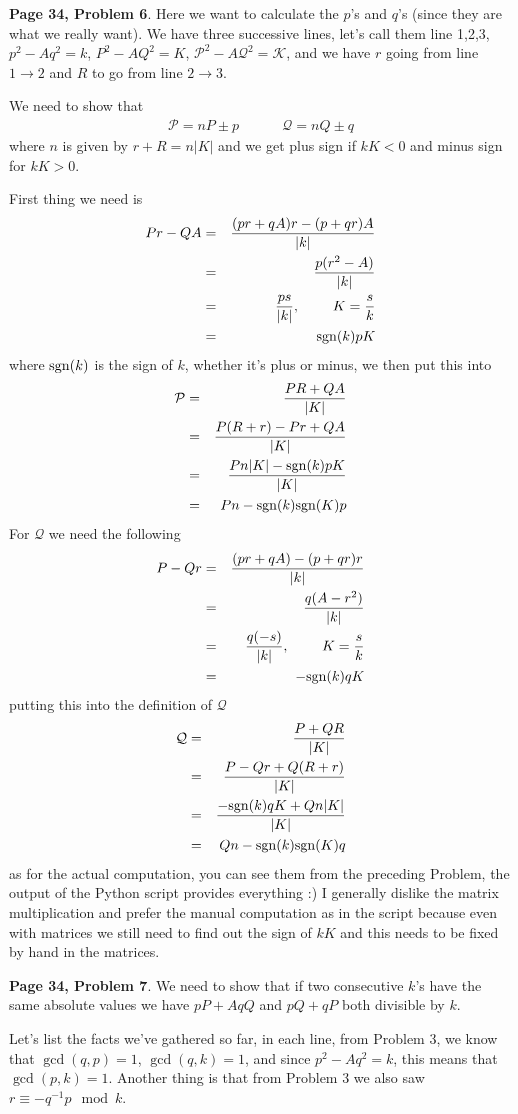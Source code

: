 \documentclass[aps,preprint,preprintnumbers,nofootinbib,showpacs,prd]{revtex4-1}
\newcommand{\nbea}{\begin{eqnarray*}}
\newcommand{\neea}{\end{eqnarray*}}
\begin{document}
{\bf Page 34, Problem 6}. Here we want to calculate the $p$'s and $q$'s (since they are what we really want). We have three successive lines, let's call them line 1,2,3, $p^2 - Aq^2 = k$, $P^2 - AQ^2 = K$, $\mathcal{P}^2 - A\mathcal{Q}^2 = \mathcal{K}$, and we have $r$ going from line $1\to2$ and $R$ to go from line $2\to3$.

We need to show that 
%
\nbea
\mathcal{P} = nP \pm p ~~~~~~~~~~~~~~ \mathcal{Q} = nQ \pm q
\neea
%
where $n$ is given by $r + R = n|K|$ and we get plus sign if $kK < 0$ and minus sign for $kK > 0$.

First thing we need is
%
\nbea
Pr - QA & = & \frac{(pr + qA)r - (p + qr)A}{|k|} \\
& = & \frac{p(r^2 - A)}{|k|} \\
& = & \frac{ps}{|k|}, ~~~~~~~ K = \frac{s}{k} \\
& = & {\rm sgn}(k) pK
\neea
%
where ${\rm sgn}(k)$ is the sign of $k$, whether it's plus or minus, we then put this into
%
\nbea
\mathcal{P} & = & \frac{PR + QA}{|K|} \\
& = & \frac{P(R + r) - Pr + QA}{|K|} \\
& = & \frac{Pn|K| - {\rm sgn}(k) pK}{|K|} \\
& = & Pn - {\rm sgn}(k) {\rm sgn}(K) p
\neea
%
For $\mathcal{Q}$ we need the following
%
\nbea
P -Qr & = & \frac{(pr + qA) - (p + qr)r}{|k|} \\
& = & \frac{q(A-r^2)}{|k|} \\
& = & \frac{q(-s)}{|k|}, ~~~~~~~ K = \frac{s}{k} \\
& = & -{\rm sgn}(k)q K
\neea
%
putting this into the definition of $\mathcal{Q}$
%
\nbea
\mathcal{Q} & = & \frac{P + QR}{|K|} \\
& = & \frac{P - Qr + Q(R + r)}{|K|} \\
& = & \frac{-{\rm sgn}(k) qK + Qn|K|}{|K|} \\
& = & Qn - {\rm sgn}(k){\rm sgn}(K) q
\neea
%
as for the actual computation, you can see them from the preceding Problem, the output of the Python script provides everything :) I generally dislike the matrix multiplication and prefer the manual computation as in the script because even with matrices we still need to find out the sign of $kK$ and this needs to be fixed by hand in the matrices.

{\bf Page 34, Problem 7}. We need to show that if two consecutive $k$'s have the same absolute values we have $pP + AqQ$ and $pQ + qP$ both divisible by $k$.

Let's list the facts we've gathered so far, in each line, from Problem 3, we know that $\gcd(q,p) = 1$, $\gcd(q,k) = 1$, and since $p^2 - Aq^2 = k$, this means that $\gcd(p,k) = 1$. Another thing is that from Problem 3 we also saw $r \equiv -q^{-1}p \mod{k}$.
\end{document}
